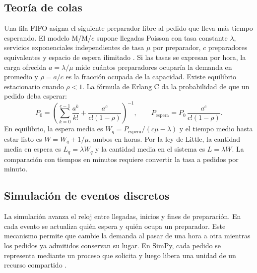 \subsection{Teoría de colas}
Una fila FIFO asigna el siguiente preparador libre al pedido que lleva más tiempo esperando.
El modelo M/M/$c$ supone llegadas Poisson con tasa constante $\lambda$, servicios exponenciales independientes de tasa $\mu$ por preparador, $c$ preparadores equivalentes y espacio de espera ilimitado \cite{bertsekas_colas,taha_io_2004}.
Si las tasas se expresan por hora, la carga ofrecida $a=\lambda/\mu$ mide cuántos preparadores ocuparía la demanda en promedio y $\rho=a/c$ es la fracción ocupada de la capacidad.
Existe equilibrio estacionario cuando $\rho<1$.
La fórmula de Erlang C da la probabilidad de que un pedido deba esperar:
\[
 P_0=\left(\sum_{k=0}^{c-1}\frac{a^k}{k!}+
              \frac{a^c}{c!(1-\rho)}\right)^{-1},
 \qquad P_{\mathrm{espera}}=P_0\,\frac{a^c}{c!(1-\rho)}.
\]
En equilibrio, la espera media es $W_q=P_{\mathrm{espera}}/(c\mu-\lambda)$ y el tiempo medio hasta estar listo es $W=W_q+1/\mu$, ambos en horas.
Por la ley de Little, la cantidad media en espera es $L_q=\lambda W_q$ y la cantidad media en el sistema es $L=\lambda W$.
La comparación con tiempos en minutos requiere convertir la tasa a pedidos por minuto.
\subsection{Simulación de eventos discretos}
La simulación avanza el reloj entre llegadas, inicios y fines de preparación.
En cada evento se actualiza quién espera y quién ocupa un preparador.
Este mecanismo permite que cambie la demanda al pasar de una hora a otra mientras los pedidos ya admitidos conservan su lugar.
En SimPy, cada pedido se representa mediante un proceso que solicita y luego libera una unidad de un recurso compartido \cite{simpy_shared_resources}.
